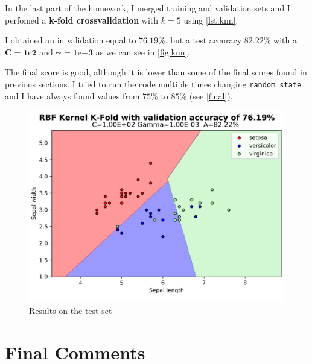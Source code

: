 \documentclass[a4paper, 11pt]{article}
\begin{document}
	In the last part of the homework, I merged training and validation sets and I perfomed a \textbf{k-fold crossvalidation} with $k=5$ using \vref{lst:knn}.
	
	
	
	I obtained an in validation equal to $\boldsymbol{76.19\%}$, but a test accuracy $\boldsymbol{82.22\%}$ with a $\boldsymbol{C=1\mathrm{e}{2}}$ and $\boldsymbol{\gamma=1\mathrm{e}{-3}}$ as we can see in \vref{fig:knn}.
	
	The final score is good, although it is lower than some of the final scores found in previous sections. I tried to run the code multiple times changing \texttt{random\_state} and I have always found values from $75\%$ to $85\%$  (see \vref{final}).
	
	\begin{figure}[ht!]
		\centering
		\includegraphics[width=0.5\paperwidth]{img/fig03.png}
		\caption{Results on the test set}
		\label{fig:knn}
	\end{figure}
	\section{Final Comments} \label{final}
	
\end{document}
